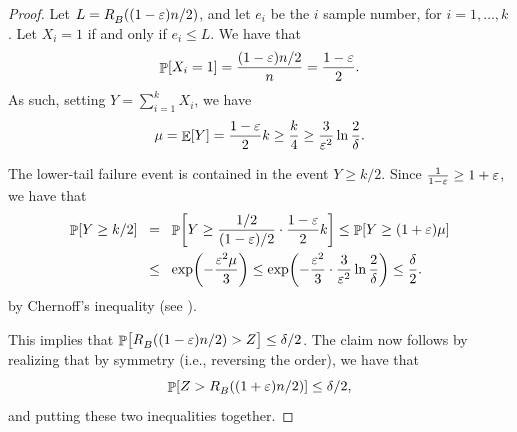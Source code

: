\begin{proof}
    Let $L = \rankY{B}{(1-\eps)n/2}$, and let $e_i$ be the $i$\th
    sample number, for $i=1,\ldots, k$.  Let $X_i=1$ if and only if
    $e_i \leq L$. We have that
    \begin{equation*}
        \Prob{X_i =1 } = \frac{ (1-\eps)n/2}{n} = \frac{1-\eps}{2}.        
    \end{equation*}
    As such, setting $Y = \sum_{i=1}^k X_i$, we have
    \begin{equation*}
        \mu = \Ex{Y} = \frac{1-\eps}{2}  k%
        \geq%
        \frac{k}{4} \geq
        \frac{3}{\eps^2} \ln \frac{2}{\delta} .
    \end{equation*}

    The lower-tail failure event is contained in the event $Y \geq
    k/2$. Since $\tfrac{1}{1-{\varepsilon}} \geq 1+{\varepsilon}$, we have that
    \begin{align*}
        \Prob{Y \geq k/2}%
        &\EQ %
        \Prob{Y \geq \frac{1/2}{(1-\eps)/2} \cdot \frac{1-\eps}{2} k}%
        \leq%
        \Prob{Y \geq (1+\eps) \mu}%
        \\&
        \LEQ %
        \exp\pth{ - \frac{\eps^2 \mu}{3}}
        \leq %
        \exp\pth{ - \frac{\eps^2}{3} \cdot         \frac{3}{\eps^2} \ln \frac{2}{\delta} 
        }
        \leq%
        \frac{\delta}{2}.
    \end{align*}
    by Chernoff's inequality (see ).

    This implies that
    $\Prob{\bigl. \rankY{B}{(1-\eps)n/2} > Z } \leq \delta/2$.  The
    claim now follows by realizing that by symmetry (i.e., reversing
    the order), we have that
    \begin{equation*}
        \Prob{ Z > \rankY{B}{(1+\eps)n/2} } \leq \delta/2,
    \end{equation*}
    and putting these two inequalities together.
\end{proof}


